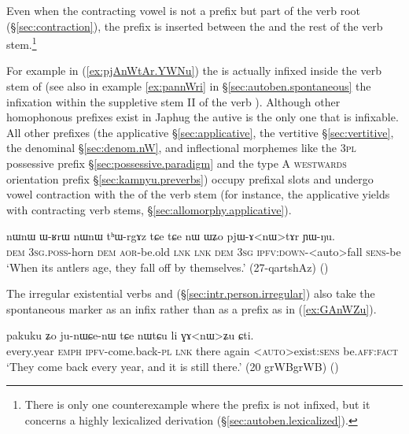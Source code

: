 Even when the contracting vowel  is not a prefix but part of the verb root (§\ref{sec:contraction}), the  prefix is inserted between the  and the rest of the verb stem.\footnote{There is only one counterexample where the  prefix is not infixed, but it concerns a highly lexicalized derivation (§\ref{sec:autoben.lexicalized}). }

For example in (\ref{ex:pjAnWtAr.YWNu}) the  is actually infixed inside the verb stem of  (see also in example \ref{ex:pannWri} in §\ref{sec:autoben.spontaneous} the infixation within the suppletive stem II  of the verb ).  Although other homophonous prefixes exist in Japhug the autive is the only one that is infixable. All other  prefixes (the applicative §\ref{sec:applicative}, the vertitive §\ref{sec:vertitive}, the denominal  §\ref{sec:denom.nW}, and inflectional morphemes like the \textsc{3pl} possessive prefix §\ref{sec:possessive.paradigm} and the type A \textsc{westwards} orientation prefix §\ref{sec:kamnyu.preverbs}) occupy prefixal slots and undergo vowel contraction with the  of the verb stem (for instance, the applicative yields  with contracting verb stems, §\ref{sec:allomorphy.applicative}).
 
 \begin{exe}
\ex \label{ex:pjAnWtAr.YWNu}
\gll nɯnɯ ɯ-ʁrɯ nɯnɯ tʰɯ-rgɤz tɕe tɕe nɯ ɯʑo pjɯ-ɤ<nɯ>tɤr ɲɯ-ŋu.  \\
\textsc{dem} \textsc{3sg}.\textsc{poss}-horn \textsc{dem} \textsc{aor}-be.old \textsc{lnk}   \textsc{lnk} \textsc{dem} \textsc{3sg} \textsc{ipfv}:\textsc{down}-<auto>fall \textsc{sens}-be \\
\glt `When its antlers age, they fall off by themselves.' (27-qartshAz)
()
\end{exe}


The irregular existential verbs  and  (§\ref{sec:intr.person.irregular}) also take  the spontaneous marker as an infix rather than as a prefix as in (\ref{ex:GAnWZu}). 

\begin{exe}
\ex \label{ex:GAnWZu}
\gll pakuku ʑo ju-nɯɕe-nɯ tɕe nɯtɕu li ɣɤ<nɯ>ʑu ɕti. 	\\
 every.year \textsc{emph} \textsc{ipfv}-come.back-\textsc{pl} \textsc{lnk} there again <\textsc{auto}>exist:\textsc{sens} be.\textsc{aff}:\textsc{fact} \\
 \glt `They come back every year, and it is still there.' (20 grWBgrWB)
()
\end{exe}

